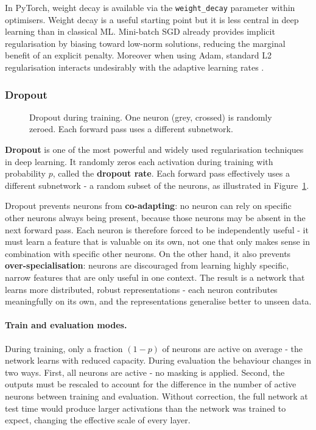 In PyTorch, weight decay is available via the \texttt{weight\_decay} parameter within optimisers. Weight decay is a useful starting point but it is less central in deep learning than in classical ML. Mini-batch SGD already provides implicit regularisation by biasing toward low-norm solutions, reducing the marginal benefit of an explicit penalty. Moreover when using Adam, standard L2 regularisation interacts undesirably with the adaptive learning rates \parencite{Loshchilov2019}.


\subsubsection{Dropout}

\begin{figure}
\centering
{}
\resizebox{0.36\textwidth}{!}{}
\caption{Dropout during training. One neuron (grey, crossed) is randomly zeroed. Each forward pass uses a different subnetwork.}
\label{fig:dropout}
\end{figure}

\textbf{Dropout} \parencite{Srivastava2014} is one of the most powerful and widely used regularisation techniques in deep learning. It randomly zeros each activation during training with probability $p$, called the \textbf{dropout rate}. Each forward pass effectively uses a different subnetwork - a random subset of the neurons, as illustrated in Figure~\ref{fig:dropout}.

Dropout prevents neurons from \textbf{co-adapting}: no neuron can rely on specific other neurons always being present, because those neurons may be absent in the next forward pass. Each neuron is therefore forced to be independently useful - it must learn a feature that is valuable on its own, not one that only makes sense in combination with specific other neurons. On the other hand, it also prevents \textbf{over-specialisation}: neurons are discouraged from learning highly specific, narrow features that are only useful in one context. The result is a network that learns more distributed, robust representations - each neuron contributes meaningfully on its own, and the representations generalise better to unseen data.

\paragraph{Train and evaluation modes.}
During training, only a fraction $(1-p)$ of neurons are active on average - the network learns with reduced capacity. During evaluation the behaviour changes in two ways. First, all neurons are active - no masking is applied. Second, the outputs must be rescaled to account for the difference in the number of active neurons between training and evaluation. Without correction, the full network at test time would produce larger activations than the network was trained to expect, changing the effective scale of every layer.

